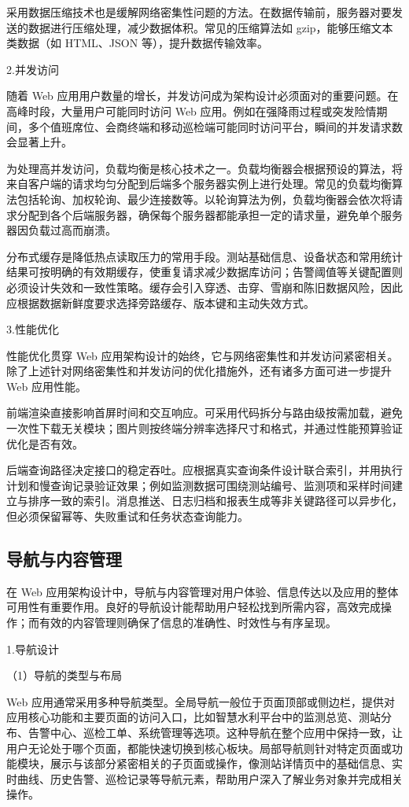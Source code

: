 采用数据压缩技术也是缓解网络密集性问题的方法。在数据传输前，服务器对要发送的数据进行压缩处理，减少数据体积。常见的压缩算法如 gzip，能够压缩文本类数据（如 HTML、JSON 等），提升数据传输效率。

2.并发访问

随着 Web 应用用户数量的增长，并发访问成为架构设计必须面对的重要问题。在高峰时段，大量用户可能同时访问 Web 应用。例如在强降雨过程或突发险情期间，多个值班席位、会商终端和移动巡检端可能同时访问平台，瞬间的并发请求数会显著上升。

为处理高并发访问，负载均衡是核心技术之一。负载均衡器会根据预设的算法，将来自客户端的请求均匀分配到后端多个服务器实例上进行处理。常见的负载均衡算法包括轮询、加权轮询、最少连接数等。以轮询算法为例，负载均衡器会依次将请求分配到各个后端服务器，确保每个服务器都能承担一定的请求量，避免单个服务器因负载过高而崩溃。

分布式缓存是降低热点读取压力的常用手段。测站基础信息、设备状态和常用统计结果可按明确的有效期缓存，使重复请求减少数据库访问；告警阈值等关键配置则必须设计失效和一致性策略。缓存会引入穿透、击穿、雪崩和陈旧数据风险，因此应根据数据新鲜度要求选择旁路缓存、版本键和主动失效方式。

3.性能优化

性能优化贯穿 Web 应用架构设计的始终，它与网络密集性和并发访问紧密相关。除了上述针对网络密集性和并发访问的优化措施外，还有诸多方面可进一步提升 Web 应用性能。

前端渲染直接影响首屏时间和交互响应。可采用代码拆分与路由级按需加载，避免一次性下载无关模块；图片则按终端分辨率选择尺寸和格式，并通过性能预算验证优化是否有效。

后端查询路径决定接口的稳定吞吐。应根据真实查询条件设计联合索引，并用执行计划和慢查询记录验证效果；例如监测数据可围绕测站编号、监测项和采样时间建立与排序一致的索引。消息推送、日志归档和报表生成等非关键路径可以异步化，但必须保留幂等、失败重试和任务状态查询能力。

\subsection{导航与内容管理}

在 Web 应用架构设计中，导航与内容管理对用户体验、信息传达以及应用的整体可用性有重要作用。良好的导航设计能帮助用户轻松找到所需内容，高效完成操作；而有效的内容管理则确保了信息的准确性、时效性与有序呈现。

1.导航设计

（1）导航的类型与布局

Web 应用通常采用多种导航类型。全局导航一般位于页面顶部或侧边栏，提供对应用核心功能和主要页面的访问入口，比如智慧水利平台中的监测总览、测站分布、告警中心、巡检工单、系统管理等选项。这种导航在整个应用中保持一致，让用户无论处于哪个页面，都能快速切换到核心板块。局部导航则针对特定页面或功能模块，展示与该部分紧密相关的子页面或操作，像测站详情页中的基础信息、实时曲线、历史告警、巡检记录等导航元素，帮助用户深入了解业务对象并完成相关操作。

